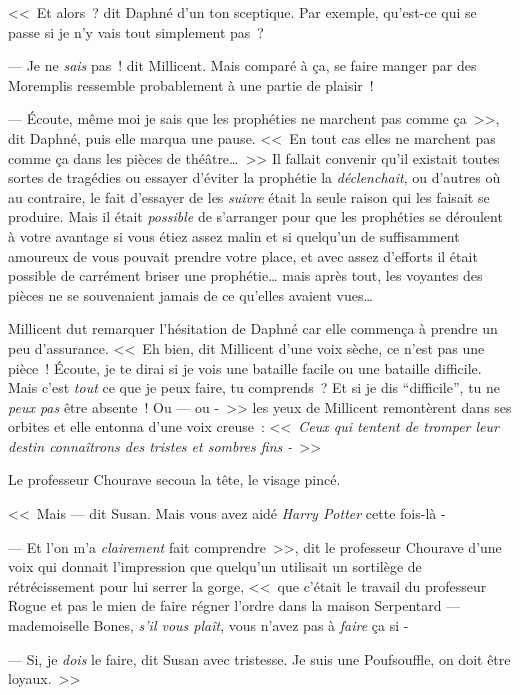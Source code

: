 <<~Et alors~? dit Daphné d'un ton sceptique. Par exemple, qu'est-ce qui se passe si je n'y vais tout simplement pas~?

--- Je ne \emph{sais} pas~! dit Millicent. Mais comparé à ça, se faire manger par des Moremplis ressemble probablement à une partie de plaisir~!

--- Écoute, même moi je sais que les prophéties ne marchent pas comme ça~>>, dit Daphné, puis elle marqua une pause. <<~En tout cas elles ne marchent pas comme ça dans les pièces de théâtre…~>> Il fallait convenir qu'il existait toutes sortes de tragédies ou essayer d'éviter la prophétie la \emph{déclenchait}, ou d'autres où au contraire, le fait d'essayer de les \emph{suivre} était la seule raison qui les faisait se produire. Mais il était \emph{possible} de s'arranger pour que les prophéties se déroulent à votre avantage si vous étiez assez malin et si quelqu'un de suffisamment amoureux de vous pouvait prendre votre place, et avec assez d'efforts il était possible de carrément briser une prophétie… mais après tout, les voyantes des pièces ne se souvenaient jamais de ce qu'elles avaient vues…

Millicent dut remarquer l'hésitation de Daphné car elle commença à prendre un peu d'assurance. <<~Eh bien, dit Millicent d'une voix sèche, ce n'est pas une pièce~! Écoute, je te dirai si je vois une bataille facile ou une bataille difficile. Mais c'est \emph{tout} ce que je peux faire, tu comprends~? Et si je dis “difficile”, tu ne \emph{peux pas} être absente~! Ou — ou -~>> les yeux de Millicent remontèrent dans ses orbites et elle entonna d'une voix creuse~: <<~\emph{Ceux qui tentent de tromper leur destin connaîtrons des tristes et sombres fins -}~>>

\later

Le professeur Chourave secoua la tête, le visage pincé.

<<~Mais — dit Susan. Mais vous avez aidé \emph{Harry Potter} cette fois-là -

--- Et l'on m'a \emph{clairement} fait comprendre~>>, dit le professeur Chourave d'une voix qui donnait l'impression que quelqu'un utilisait un sortilège de rétrécissement pour lui serrer la gorge, <<~que c'était le travail du professeur Rogue et pas le mien de faire régner l'ordre dans la maison Serpentard — mademoiselle Bones, \emph{s'il vous plaît}, vous n'avez pas à \emph{faire} ça si -

--- Si, je \emph{dois} le faire, dit Susan avec tristesse. Je suis une Poufsouffle, on doit être loyaux.~>>

